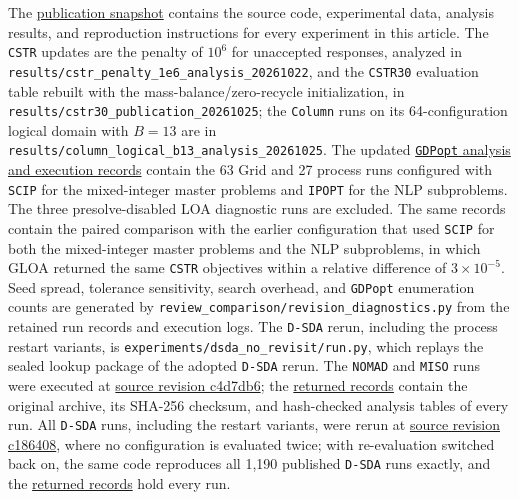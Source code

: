 The \href{https://github.com/SECQUOIA/Black-Box-for-GDP/tree/ea65c5339486b576008df68645ea68d22f7c7213}{publication snapshot} contains the source code, experimental data, analysis results, and reproduction instructions for every experiment in this article.
The \texttt{CSTR} updates are the penalty of \(10^6\) for unaccepted responses, analyzed in \nolinkurl{results/cstr_penalty_1e6_analysis_20261022}, and the \texttt{CSTR30} evaluation table rebuilt with the mass-balance/zero-recycle initialization, in \nolinkurl{results/cstr30_publication_20261025}; the \texttt{Column} runs on its 64-configuration logical domain with \(B=13\) are in \nolinkurl{results/column_logical_b13_analysis_20261025}.
The updated \href{https://github.com/SECQUOIA/Black-Box-for-GDP/tree/329c6f93f4940436425582ae60323c0c9f95b581/results/gdpopt_scip_ipopt_analysis_20261030}{\texttt{GDPopt} analysis and execution records} contain the 63 Grid and 27 process runs configured with \texttt{SCIP} for the mixed-integer master problems and \texttt{IPOPT} for the NLP subproblems.
The three presolve-disabled LOA diagnostic runs are excluded.
The same records contain the paired comparison with the earlier configuration that used \texttt{SCIP} for both the mixed-integer master problems and the NLP subproblems, in which GLOA returned the same \texttt{CSTR} objectives within a relative difference of \(3\times10^{-5}\).
Seed spread, tolerance sensitivity, search overhead, and \texttt{GDPopt} enumeration counts are generated by \nolinkurl{review_comparison/revision_diagnostics.py} from the retained run records and execution logs.
The \texttt{D-SDA} rerun, including the process restart variants, is \nolinkurl{experiments/dsda_no_revisit/run.py}, which replays the sealed lookup package of the adopted \texttt{D-SDA} rerun.
The \texttt{NOMAD} and \texttt{MISO} runs were executed at \href{https://github.com/SECQUOIA/Black-Box-for-GDP/tree/c4d7db6b671bbe92a314be524a650d75cd49529c}{source revision c4d7db6}; the \href{https://github.com/SECQUOIA/Black-Box-for-GDP/tree/841ca986f175dda4d91c784b195e60279cf94b99/results/pr56_dantzig_return_20261031}{returned records} contain the original archive, its SHA-256 checksum, and hash-checked analysis tables of every run.
All \texttt{D-SDA} runs, including the restart variants, were rerun at \href{https://github.com/SECQUOIA/Black-Box-for-GDP/tree/c186408728c6f95ac33a5465edd53035d85c5620}{source revision c186408}, where no configuration is evaluated twice; with re-evaluation switched back on, the same code reproduces all 1,190 published \texttt{D-SDA} runs exactly, and the \href{https://github.com/SECQUOIA/Black-Box-for-GDP/tree/f3b57ac44cccb27552b3a8618ce6abd463e540a4/results/dsda_no_revisit_20261031}{returned records} hold every run.
